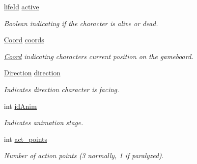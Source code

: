 \begin{DoxyCompactItemize}
\hyperlink{substruct_8h_a06473d9d883696038e0493de3944c9e4}{life\+Id} \hyperlink{structentity__t_a0d70a87514cf7efe85191e3c017d573a}{active}
\begin{DoxyCompactList}\small\item\em Boolean indicating if the character is alive or dead. \end{DoxyCompactList}\item 
\mbox{\label{structentity__t_a90ace45b66435b2f4c6da0e3da82ad72}} 
\hyperlink{struct_coord}{Coord} \hyperlink{structentity__t_a90ace45b66435b2f4c6da0e3da82ad72}{coords}
\begin{DoxyCompactList}\small\item\em \hyperlink{struct_coord}{Coord} indicating character\textquotesingle{}s current position on the gameboard. \end{DoxyCompactList}\item 
\mbox{\label{structentity__t_a3c94e55b0e18cd033c69eea09391a5c7}} 
\hyperlink{substruct_8h_a224b9163917ac32fc95a60d8c1eec3aa}{Direction} \hyperlink{structentity__t_a3c94e55b0e18cd033c69eea09391a5c7}{direction}
\begin{DoxyCompactList}\small\item\em Indicates direction character is facing. \end{DoxyCompactList}\item 
\mbox{\label{structentity__t_a38c191aa02dca7815369a49837a3eb8e}} 
int \hyperlink{structentity__t_a38c191aa02dca7815369a49837a3eb8e}{id\+Anim}
\begin{DoxyCompactList}\small\item\em Indicates animation stage. \end{DoxyCompactList}\item 
\mbox{\label{structentity__t_ae92b761dc4c74522fc725d5636f7545f}} 
int \hyperlink{structentity__t_ae92b761dc4c74522fc725d5636f7545f}{act\+\_\+points}
\begin{DoxyCompactList}\small\item\em Number of action points (3 normally, 1 if paralyzed). \end{DoxyCompactList}\item 
\mbox{\label{structentity__t_ab609092b4a92813e695ef1023fd2c162}} 

\end{DoxyCompactItemize}

